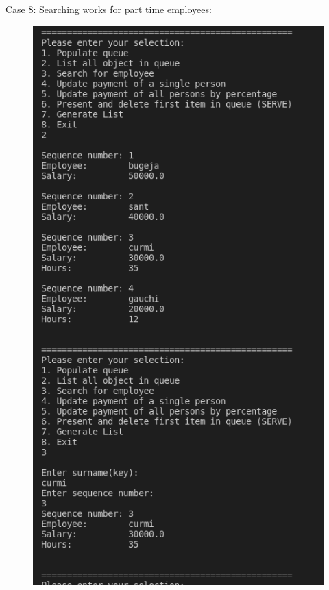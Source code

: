 \documentclass[12pt]{article}
\begin{document}
Case 8: Searching works for part time employees:
\bigskip
\begin{figure}[h]
\centering
\includegraphics[scale=0.30]{Images/Testing 3/5.png}
\end{figure}
\bigskip
\newpage
\end{document}
